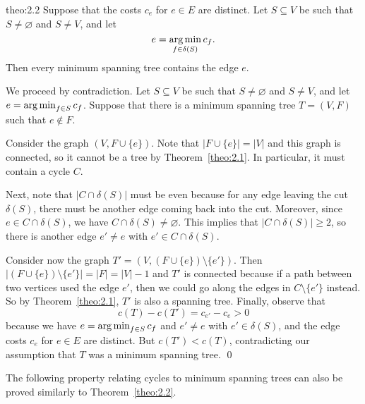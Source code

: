 \begin{theo}{theo:2.2}
    Suppose that the costs $c_e$ for $e \in E$ are distinct. 
    Let $S \subseteq V$ be such that $S \neq \varnothing$ and $S \neq V$, 
    and let 
    \[ e = \operatorname*{arg\,min}_{f \in \delta(S)} c_f. \] 
    Then every minimum spanning tree contains the edge $e$. 
\end{theo}\vspace{-0.25cm}
\begin{pf}
    We proceed by contradiction. Let $S \subseteq V$ be such that $S 
    \neq \varnothing$ and $S \neq V$, and let $e = \operatorname*{arg\,min}_{f\in S} c_f$. 
    Suppose that there is a minimum spanning tree $T = (V, F)$ such that 
    $e \notin F$. 

    Consider the graph $(V, F \cup \{e\})$. Note that $|F \cup \{e\}| = |V|$ 
    and this graph is connected, so it cannot be a tree by Theorem~\ref{theo:2.1}. 
    In particular, it must contain a cycle $C$. 

    Next, note that $|C \cap \delta(S)|$ must be even because for any 
    edge leaving the cut $\delta(S)$, there must be another edge coming back 
    into the cut. Moreover, since $e \in C \cap \delta(S)$, we have 
    $C \cap \delta(S) \neq \varnothing$. This implies that 
    $|C \cap \delta(S)| \geq 2$, so there is another edge $e' \neq e$ 
    with $e' \in C \cap \delta(S)$.

    Consider now the graph $T' = (V, (F \cup \{e\}) \setminus \{e'\})$. 
    Then $|(F \cup \{e\}) \setminus \{e'\}| = |F| = |V| - 1$ and $T'$ is 
    connected because if a path between two vertices used the edge $e'$, 
    then we could go along the edges in $C \setminus \{e'\}$ instead. 
    So by Theorem~\ref{theo:2.1}, $T'$ is also a spanning tree. 
    Finally, observe that 
    \[ c(T) - c(T') = c_{e'} - c_e > 0 \] 
    because we have $e = \operatorname*{arg\,min}_{f\in S} c_f$ and $e' \neq e$ with 
    $e' \in \delta(S)$, and the edge 
    costs $c_e$ for $e \in E$ are distinct. But $c(T') < c(T)$, contradicting 
    our assumption that $T$ was a minimum 
    spanning tree. \qed
\end{pf}\vspace{-0.25cm}

The following property relating cycles to minimum spanning trees 
can also be proved similarly to Theorem~\ref{theo:2.2}. 

